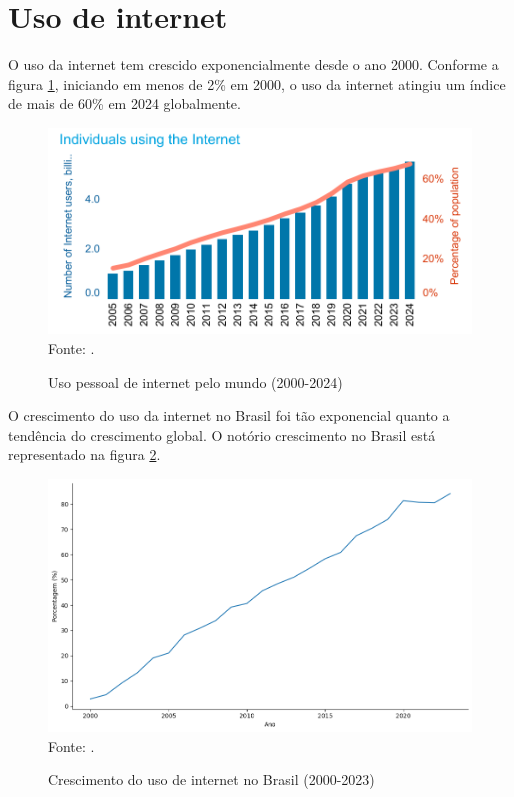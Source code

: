\section{Uso de internet}

O uso da internet tem crescido exponencialmente desde o ano 2000. Conforme a figura \ref{fig:individuals_using_internet_itu}, iniciando em menos de 2\% em 2000, o uso da internet atingiu um índice de mais de 60\% em 2024 globalmente. 

\begin{figure}[H]
    \centering
    \caption{Uso pessoal de internet pelo mundo (2000-2024)}
    \includegraphics[width=0.78\linewidth]{figuras/internet/individuos_uso_internet_itu.png}
    \label{fig:individuals_using_internet_itu}
    \\ \footnotesize{Fonte: \cite{ITU_uso_internet_mundo}.}
\end{figure}

O crescimento do uso da internet no Brasil foi tão exponencial quanto a tendência do crescimento global. O notório crescimento no Brasil está representado na figura \ref{fig:crescimento_internet_brasil_itu}.

\begin{figure}[H]
    \centering
    \caption{Crescimento do uso de internet no Brasil (2000-2023)}
    \includegraphics[width=1\linewidth]{figuras/internet/lineplot_uso_internet_brasil_itu.png}
    \label{fig:crescimento_internet_brasil_itu}
    \footnotesize{Fonte: \cite{ITU_crescimento_uso_internet_brasil}.}
\end{figure}

